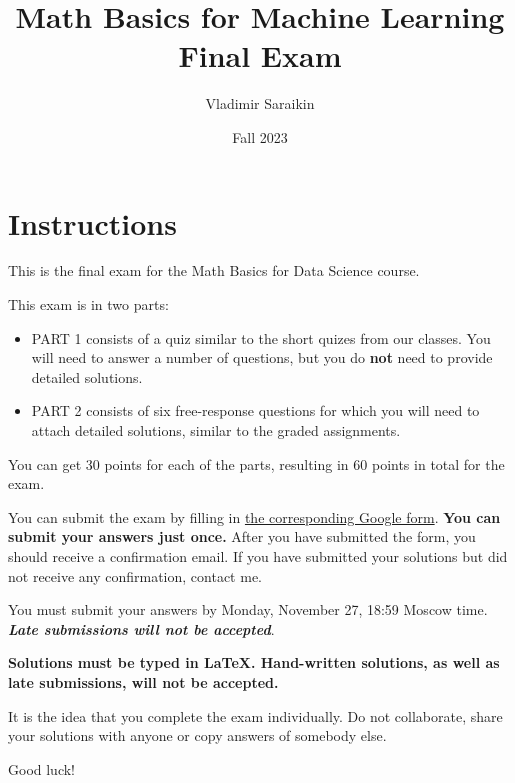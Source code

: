 \documentclass{exam}
\title{Math Basics for Machine Learning \\ 
Final Exam}
\author{Vladimir Saraikin}
\date{Fall 2023}
\begin{document}
\maketitle

\section*{Instructions}

This is the final exam for the Math Basics for Data Science course.

\vspace{0.25cm}
\noindent
This exam is in two parts:
\begin{itemize}
\item PART 1 consists of a quiz similar to the short quizes from our classes. You will need to answer a number of questions, but you do \textbf{not} need to provide detailed solutions.

\item PART 2 consists of six free-response questions for which you will need to attach detailed solutions, similar to the graded assignments.
\end{itemize}

\vspace{0.25cm}
\noindent
You can get 30 points for each of the parts, resulting in 60 points in total for the exam.

\vspace{0.25cm}
\noindent
You can submit the exam by filling in \href{https://forms.gle/BAJPynhB8N43QFk47}{the corresponding Google form}. \textbf{You can submit your answers just once.} After you have submitted the form, you should receive a confirmation email. If you have submitted your solutions but did not receive any confirmation, contact me.

\vspace{0.25cm}
\noindent
You must submit your answers by Monday, November 27, 18:59 Moscow time. \textbf{\textit{Late submissions will not be accepted}}.

\vspace{0.25cm}
\noindent
\textbf{Solutions must be typed in LaTeX. Hand-written solutions, as well as late submissions, will not be accepted.}

\vspace{0.25cm}
\noindent
It is the idea that you complete the exam individually. Do not collaborate, share your solutions with anyone or copy answers of somebody else.

\vspace{0.25cm}
\noindent
Good luck!
\end{document}

